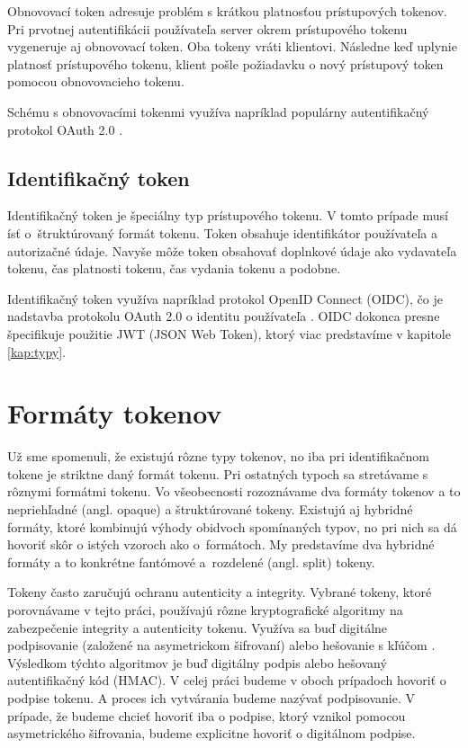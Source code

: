 Obnovovací token adresuje problém s krátkou platnosťou prístupových tokenov. Pri prvotnej autentifikácii používateľa server okrem prístupového tokenu vygeneruje aj obnovovací token. Oba tokeny vráti klientovi. Následne keď uplynie platnosť prístupového tokenu, klient pošle požiadavku o nový prístupový token pomocou obnovovacieho tokenu. 

Schému s obnovovacími tokenmi využíva napríklad populárny autentifikačný protokol OAuth 2.0 \cite{oauth2}.


\subsection{Identifikačný token}

Identifikačný token je špeciálny typ prístupového tokenu. V tomto prípade musí ísť o~štruktúrovaný formát tokenu. Token obsahuje identifikátor používateľa a autorizačné údaje. Navyše môže token obsahovať doplnkové údaje ako vydavateľa tokenu, čas platnosti tokenu, čas vydania tokenu a podobne.

Identifikačný token využíva napríklad protokol OpenID Connect (OIDC), čo je nadstavba protokolu OAuth 2.0 o identitu používateľa \cite{oidc}. OIDC dokonca presne špecifikuje použitie JWT (JSON Web Token), ktorý viac predstavíme v kapitole \ref{kap:typy}.


\section{Formáty tokenov}
\label{sec:formats}

Už sme spomenuli, že existujú rôzne typy tokenov, no iba pri identifikačnom tokene je striktne daný formát tokenu. Pri ostatných typoch sa stretávame s rôznymi formátmi tokenu. Vo všeobecnosti rozoznávame dva formáty tokenov a to nepriehľadné (angl. opaque) a štruktúrované tokeny. Existujú aj hybridné formáty, ktoré kombinujú výhody obidvoch spomínaných typov, no pri nich sa dá hovoriť skôr o istých vzoroch ako o~formátoch. My predstavíme dva hybridné formáty a to konkrétne fantómové a~rozdelené (angl. split) tokeny.

Tokeny často zaručujú ochranu autenticity a integrity. Vybrané tokeny, ktoré porovnávame v tejto práci, používajú rôzne kryptografické algoritmy na zabezpečenie integrity a autenticity tokenu. Využíva sa buď digitálne podpisovanie (založené na asymetrickom šifrovaní) alebo hešovanie s kľúčom \cite{hmac_povodny}. Výsledkom týchto algoritmov je buď digitálny podpis alebo hešovaný autentifikačný kód (HMAC). V celej práci budeme v oboch prípadoch hovoriť o podpise tokenu. A proces ich vytvárania budeme nazývať podpisovanie. V prípade, že budeme chcieť hovoriť iba o podpise, ktorý vznikol pomocou asymetrického šifrovania, budeme explicitne hovoriť o digitálnom podpise.

